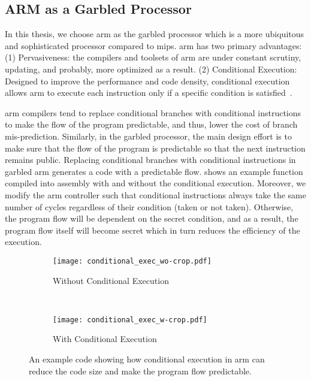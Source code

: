 \subsection{ARM as a Garbled Processor}\label{ssec:arm}
In this thesis, we choose \gls{arm} as the garbled processor which is a more ubiquitous and sophisticated processor compared to \gls{mips}.
\gls{arm} has two primary advantages:
(1) Pervasiveness: the compilers and toolsets of \gls{arm} are under constant scrutiny, updating, and probably, more optimized as a result.
(2) Conditional Execution: Designed to improve the performance and code density, conditional execution allows \gls{arm} to execute each instruction only if a specific condition is satisfied~\cite{sloss2004arm}.

\gls{arm} compilers tend to replace conditional branches with conditional instructions to make the flow of the program predictable, and thus, lower the cost of branch mis-prediction.
Similarly, in the garbled processor, the main design effort is to make sure that the flow of the program is predictable so that the next instruction remains public.
Replacing conditional branches with conditional instructions in garbled \gls{arm} generates a code with a predictable flow.
 shows an example function compiled into assembly with and without the conditional execution.
Moreover, we modify the \gls{arm} controller such that conditional instructions always take the same number of cycles regardless of their condition (taken or not taken).
Otherwise, the program flow will be dependent on the secret condition, and as a result, the program flow itself will become secret which in turn reduces the efficiency of the execution.

\begin{figure}
    \centering
    \begin{subfigure}{0.40\columnwidth}
        \centering
        \texttt{[image: conditional\_exec\_wo-crop.pdf]}
        \caption{Without Conditional Execution}
    \end{subfigure}
    ~
    \begin{subfigure}{0.40\columnwidth}
        \centering
        \texttt{[image: conditional\_exec\_w-crop.pdf]}
        \caption{With Conditional Execution}
    \end{subfigure}
    \caption{An example code showing how conditional execution in \gls{arm} can reduce the code size and make the program flow predictable.}\label{fig:conditional_exec}
\end{figure}

